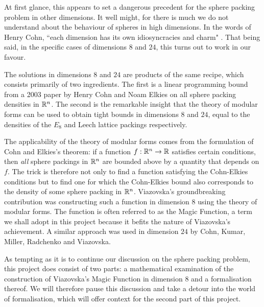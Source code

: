 At first glance, this appears to set a dangerous precedent for the sphere packing problem in other dimensions. It well might, for there is much we do not understand about the behaviour of spheres in high dimensions. In the words of Henry Cohn, ``each dimension has its own idiosyncracies and charm" \cite{CohnOnViazovskaAMS}. That being said, in the specific cases of dimensions $8$ and $24$, this turns out to work in our favour.

The solutions in dimensions $8$ and $24$ are products of the same recipe, which consists primarily of two ingredients. The first is a linear programming bound from a 2003 paper by Henry Cohn and Noam Elkies \cite[Theorem 3.1]{CohnElkies} on all sphere packing densities in $\mathbb{R}^n$. The second is the remarkable insight that the theory of modular forms can be used to obtain tight bounds in dimensions $8$ and $24$, equal to the densities of the $E_8$ and Leech lattice packings respectively.

The applicability of the theory of modular forms comes from the formulation of Cohn and Elkies's theorem: if a function $f : \mathbb{R}^n \to \mathbb{R}$ satisfies certain conditions, then \textit{all} sphere packings in $\mathbb{R}^n$ are bounded above by a quantity that depends on $f$. The trick is therefore not only to find a function satisfying the Cohn-Elkies conditions but to find one for which the Cohn-Elkies bound also corresponds to the density of some sphere packing in $\mathbb{R}^n$. Viazovska's groundbreaking contribution was constructing such a function in dimension $8$ using the theory of modular forms. The function is often referred to as the Magic Function, a term we shall adopt in this project because it befits the nature of Viazovska's achievement. A similar approach was used in dimension $24$ by Cohn, Kumar, Miller, Radchenko and Viazovska.

As tempting as it is to continue our discussion on the sphere packing problem, this project does consist of two parts: a mathematical examination of the construction of Viazovska's Magic Function in dimension $8$ and a formalisation thereof. We will therefore pause this discussion and take a detour into the world of formalisation, which will offer context for the second part of this project.